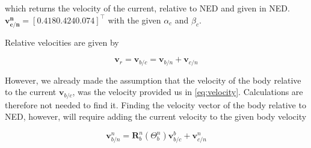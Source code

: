which returns the velocity of the current, relative to NED and given in NED. $\mathbf{v^n_{c/n}} = [0.418 0.424 0.074]^\top$ with the given $\alpha_c$ and $\beta_c$. 

Relative velocities are given by

\begin{equation}
    \boldsymbol{v}_r = \boldsymbol{v}_{b/c} = \boldsymbol{v}_{b/n} + \boldsymbol{v}_{c/n}
    \label{eq:v_r}
\end{equation}

However, we already made the assumption that the velocity of the body relative to the current $\mathbf{v}_{b/c}$, was the velocity provided us in \eqref{eq:velocity}. Calculations are therefore not needed to find it. Finding the velocity vector of the body relative to NED, however, will require adding the current velocity to the given body velocity

\begin{equation}
    \mathbf{v}^n_{b/n} = \mathbf{R}_b^n(\Theta^n_b)\mathbf{v}_{b/c}^b + \mathbf{v}^n_{c/n}
\end{equation}

